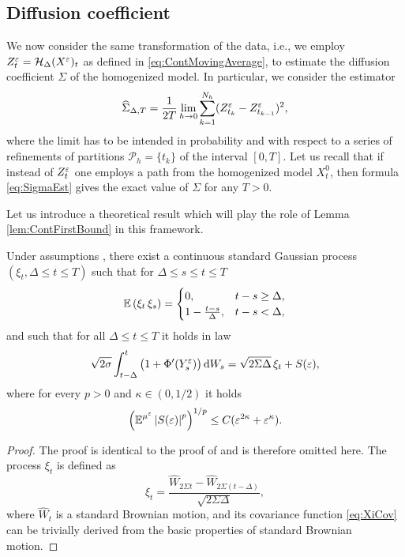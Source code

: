 \documentclass[10pt]{article}
\begin{document}
\subsection{Diffusion coefficient}

We now consider the same transformation of the data, i.e., we employ $Z^\varepsilon_t = \mathcal H_\Delta (X^\varepsilon)_t$ as defined in \eqref{eq:ContMovingAverage}, to estimate the diffusion coefficient $\Sigma$ of the homogenized model. In particular, we consider the estimator
\begin{equation}\label{eq:SigmaEstZ}
	\widehat \Sigma_{\Delta, T} = \frac1{2T} \lim_{h\to 0} \sum_{k=1}^{N_h} (Z^\varepsilon_{t_k} - Z^\varepsilon_{t_{k-1}})^2, 
\end{equation}
where the limit has to be intended in probability and with respect to a series of refinements of partitions $\mathcal P_h = \{t_k\}$ of the interval $[0, T]$. Let us recall that if instead of $Z^\varepsilon_t$ one employs a path from the homogenized model $X^0_t$, then formula \eqref{eq:SigmaEst} gives the exact value of $\Sigma$ for any $T > 0$.

Let us introduce a theoretical result which will play the role of Lemma \ref{lem:ContFirstBound} in this framework.
\begin{lemma}\label{lem:ContSecondBound} Under assumptions , there exist a continuous standard Gaussian process $(\xi_t, \Delta \leq t \leq T)$ such that for $\Delta \leq s \leq t \leq T$
	\begin{equation}\label{eq:XiCov}
		\operatorname{\mathbb{E}}\left(\xi_t \,\xi_s\right) = 
		\begin{cases}
			0, &t - s \geq \Delta,\\
			1 - \frac{t-s}{\Delta}, &t-s < \Delta,
		\end{cases}
	\end{equation}
	and such that for all $\Delta \leq t \leq T$ it holds in law
	\begin{equation}
		\sqrt{2\sigma} \int_{t-\Delta}^t \big(1 + \Phi'(Y^\varepsilon_s)\big) \,\mathrm{d} W_s = \sqrt{2\Sigma\Delta} \, \xi_t + S(\varepsilon),
	\end{equation}
	where for every $p > 0$ and $\kappa \in (0, 1/2)$ it holds
	\begin{equation}
	\left( \operatorname{\mathbb{E}}^{\mu^\varepsilon} \left\lvert S(\varepsilon)\right\rvert^p \right)^{1/p} \leq C(\varepsilon^{2\kappa} + \varepsilon^\kappa).
	\end{equation}
\end{lemma}
\begin{proof} The proof is identical to the proof of \cite[Proposition 5.7]{PaS07} and is therefore omitted here. The process $\xi_t$ is defined as
	\begin{equation}
		\xi_t = \frac{\widehat W_{2\Sigma t} - \widehat W_{2\Sigma(t - \Delta)}}{\sqrt{2\Sigma\Delta}},
	\end{equation}
	where $\widehat W_t$ is a standard Brownian motion, and its covariance function \eqref{eq:XiCov} can be trivially derived from the basic properties of standard Brownian motion.
\end{proof}
\end{document}
